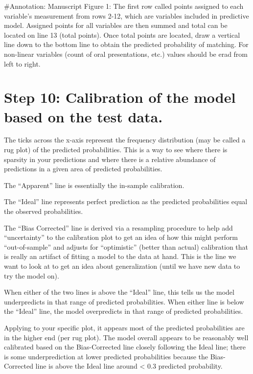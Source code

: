 \documentclass[12pt,]{article}
\begin{document}
\pagebreak

\#Annotation: Manuscript Figure 1: The first row called points assigned
to each variable's measurement from rows 2-12, which are variables
included in predictive model. Assigned points for all variables are then
summed and total can be located on line 13 (total points). Once total
points are located, draw a vertical line down to the bottom line to
obtain the predicted probability of matching. For non-linear variables
(count of oral presentations, etc.) values should be erad from left to
right.

\hypertarget{step-10-calibration-of-the-model-based-on-the-test-data.}{%
\section{Step 10: Calibration of the model based on the test
data.}\label{step-10-calibration-of-the-model-based-on-the-test-data.}}

The ticks across the x-axis represent the frequency distribution (may be
called a rug plot) of the predicted probabilities. This is a way to see
where there is sparsity in your predictions and where there is a
relative abundance of predictions in a given area of predicted
probabilities.

The ``Apparent'' line is essentially the in-sample calibration.

The ``Ideal'' line represents perfect prediction as the predicted
probabilities equal the observed probabilities.

The ``Bias Corrected'' line is derived via a resampling procedure to
help add ``uncertainty'' to the calibration plot to get an idea of how
this might perform ``out-of-sample'' and adjusts for ``optimistic''
(better than actual) calibration that is really an artifact of fitting a
model to the data at hand. This is the line we want to look at to get an
idea about generalization (until we have new data to try the model on).

When either of the two lines is above the ``Ideal'' line, this tells us
the model underpredicts in that range of predicted probabilities. When
either line is below the ``Ideal'' line, the model overpredicts in that
range of predicted probabilities.

Applying to your specific plot, it appears most of the predicted
probabilities are in the higher end (per rug plot). The model overall
appears to be reasonably well calibrated based on the Bias-Corrected
line closely following the Ideal line; there is some underprediction at
lower predicted probabilities because the Bias-Corrected line is above
the Ideal line around \textless{} 0.3 predicted probability.
\end{document}
